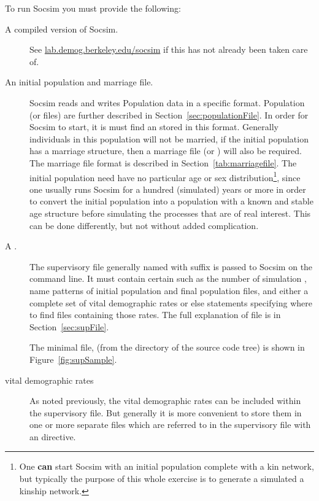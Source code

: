 To run Socsim you must provide the following:
\begin{description}

\item[A compiled version of Socsim.] See \url{lab.demog.berkeley.edu/socsim} if
  this has not already been taken care of.
  
\item [An initial population and marriage file.] Socsim reads and
  writes Population data in a specific format. Population (or
   files) are further described in
  Section~\ref{sec:populationFile}.  In order for Socsim to start, it
  is must find an  stored in this format.
  Generally individuals in this population will not be married, if the
  initial population has a marriage structure, then a
  marriage file (or ) will also be required. The marriage
  file format is described in Section~\ref{tab:marriagefile}.  
  The initial population need have no particular age or sex
  distribution\footnote{ One \textbf{can} start Socsim with an initial
    population complete with a kin network, but typically the purpose
    of this whole exercise is to generate a simulated a kinship
    network.%
}, since one usually
  runs Socsim for a  hundred (simulated) years or more in order to
  convert the initial population into a population with a known and
  stable age structure before simulating the processes that are of
  real interest.  This can be done differently, but not without added
  complication.

\item [A .] The supervisory file
  generally named with  suffix is passed to Socsim on the
  command line. It must contain certain   such as the
 number of simulation
  , name patterns of initial population and final
  population files, and either a complete set of vital
  demographic rates or else  statements specifying where
  to find files containing those rates.  The full explanation of
   file is in Section~\ref{sec:supFile}.

The minimal file, (from the  directory of the source code
tree) is shown in Figure~\ref{fig:supSample}.


\item[vital demographic rates]  As noted previously, the vital
  demographic rates can be included within the supervisory file. But
  generally it is more convenient to store them in one or more
  separate files which are referred to in the supervisory file with an
   directive. 


\end{description}
